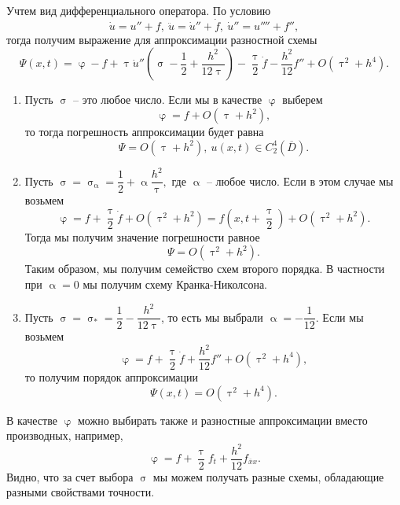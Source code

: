 \documentclass[a4paper, 12pt]{report}
\numberwithin{equation}{section}
\newcommand{\ol}{\overline}
\renewcommand{\alpha}{\upalpha}
\renewcommand{\varphi}{\upvarphi}
\renewcommand{\tau}{\uptau}
\renewcommand{\sigma}{\upsigma}
\begin{document}
		Учтем вид дифференциального оператора. По условию
		$$\dot u = u'' + f,\ \ddot u = \dot u '' + \dot f,\ \dot u '' = u'''' + f'',$$
		тогда получим выражение для аппроксимации разностной схемы
		$$\Psi(x,t) = \varphi - f + \tau \dot u''\left(\sigma - \dfrac 12 + \dfrac {h^2}{12\tau}\right) - \dfrac \tau 2 \dot f - \dfrac{h^2}{12}f'' + O(\tau^2 + h^4).$$
		\begin{enumerate}
			\item Пусть $\sigma$ -- это любое число. Если мы в качестве $\varphi$ выберем
			$$\varphi = f + O(\tau + h^2),$$ то тогда погрешность аппроксимации будет равна
			$$\Psi = O(\tau + h^2),\ u(x,t) \in C_2^4 (\ol D).$$
			\item Пусть $\sigma = \sigma_\alpha = \dfrac 12 + \alpha \dfrac{h^2}{\tau},$ где $\alpha$ -- любое число. Если в этом случае мы возьмем
			$$\varphi = f + \dfrac \tau 2 \dot f + O(\tau^2 + h^2) = f\left(x,t + \dfrac \tau 2\right) + O(\tau^2 + h^2).$$ Тогда мы получим значение погрешности равное
			$$\Psi = O(\tau^2 + h^2).$$
			Таким образом, мы получим семейство схем второго порядка. В частности при $\alpha = 0$ мы получим схему Кранка-Николсона.
			\item Пусть $\sigma = \sigma_* = \dfrac 12 - \dfrac {h^2}{12\tau}$, то есть мы выбрали $\alpha = - \dfrac {1}{12}$. Если мы возьмем
			$$\varphi = f + \dfrac \tau 2 \dot f + \dfrac{h^2}{12}f'' + O(\tau^2 + h^4),$$
			то получим порядок аппроксимации
			$$\Psi(x,t) = O(\tau^2 + h^4).$$
		\end{enumerate}
		В качестве $\varphi$ можно  выбирать также и разностные аппроксимации вместо производных, например,
		$$\varphi = f+\dfrac \tau 2 f_t + \dfrac{h^2}{12}f_{\ol x x}.$$
		Видно, что за счет выбора $\sigma$ мы можем получать разные схемы, обладающие разными свойствами точности.
\end{document}

